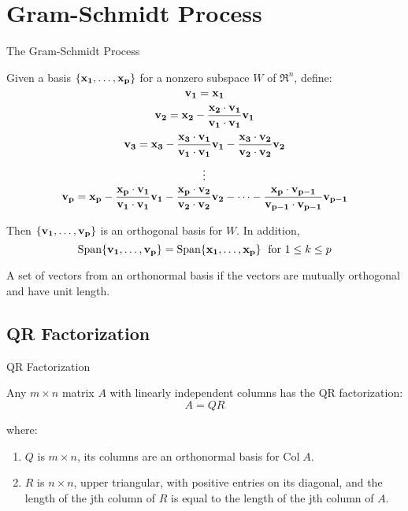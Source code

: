 \section{Gram-Schmidt Process}
\begin{theorem} The Gram-Schmidt Process

    Given a basis \(\{\bold{x_1}, \dots, \bold{x_p}\}\) for a nonzero subspace \(W\) of \(\Re^n\), define:
    \[\bold{v_1}=\bold{x_1}\]
    \[\bold{v_2}=\bold{x_2}-\frac{\bold{x_2}\cdot \bold{v_1}}{\bold{v_1} \cdot \bold{v_1}}\bold{v_1}\]
    \[\bold{v_3}=\bold{x_3}-\frac{\bold{x_3}\cdot \bold{v_1}}{\bold{v_1} \cdot \bold{v_1}}\bold{v_1}-\frac{\bold{x_3}\cdot \bold{v_2}}{\bold{v_2} \cdot \bold{v_2}}\bold{v_2}\]
    \[\vdots \notag\]
    \[\bold{v_p}=\bold{x_p}-\frac{\bold{x_p}\cdot \bold{v_1}}{\bold{v_1} \cdot \bold{v_1}}\bold{v_1}-\frac{\bold{x_p}\cdot \bold{v_2}}{\bold{v_2} \cdot \bold{v_2}}\bold{v_2} - \dots - \frac{\bold{x_p}\cdot \bold{v_{p-1}}}{\bold{v_{p-1}} \cdot \bold{v_{p-1}}}\bold{v_{p-1}}\]

    Then \(\{\bold{v_1},\dots,\bold{v_p}\}\) is an orthogonal basis for \(W\). In addition,
    \[\text{Span} \{\bold{v_1},\dots,\bold{v_p}\} = \text{Span} \{\bold{x_1},\dots,\bold{x_p}\}\; \text{ for } 1 \le k \le p\]
\end{theorem}

\begin{definition}
    A set of vectors from an orthonormal basis if the vectors are mutually orthogonal and have unit length.
\end{definition}

\subsection{QR Factorization}
\begin{theorem} QR Factorization

Any \(m\times n\) matrix \(A\) with linearly independent columns has the QR factorization:
\[A = QR\]

\noindent
where:

\begin{enumerate}
    \item \(Q\) is \(m\times n\), its columns are an orthonormal basis for \(\text{Col} \; A\).
    \item \(R\) is \(n\times n\), upper triangular, with positive entries on its diagonal, and the length of the jth column of \(R\) is equal to the length of the jth column of \(A\).
\end{enumerate}
\end{theorem}

